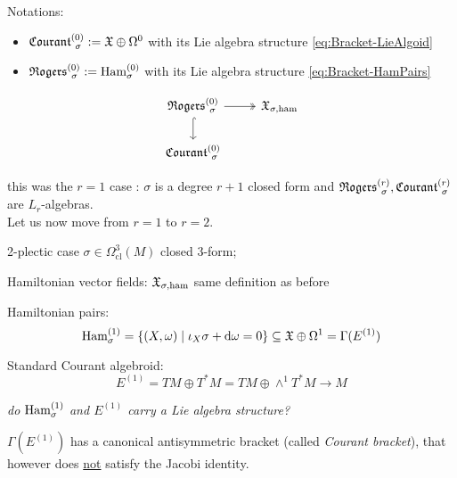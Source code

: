 \documentclass[beamer,10pt]{standalone}
\begin{document}
\begin{frame}
	\begin{block}{Notations:}
		\begin{itemize}
			\item $\Courant[\sigma]{0} := \X\oplus \Omega^{0}$ with its Lie algebra structure \eqref{eq:Bracket-LieAlgoid}
			\item $\Rogers[\sigma]{0} := \Ham^{(0)}_\sigma$ with its Lie algebra structure \eqref{eq:Bracket-HamPairs}
		\end{itemize}
	\end{block}
	\vfill

	\begin{displaymath}
		\begin{tikzcd}[ampersand replacement=\&]
			\Rogers[\sigma]{0}   \ar[r,two heads]\ar[d,hook]\& \X_{\sigma,\ham}
			\\ 
			\Courant[\sigma]{0}
		\end{tikzcd}
	\end{displaymath}
	\vfill

	\seprule
	this was the $r=1$ case : $\sigma$ is a degree $r+1$ closed form and $\Rogers[\sigma]{r},\Courant[\sigma]{r}$ are $L_r$-algebras.
	\\
	Let us now move from $r=1$ to $r=2$.

\end{frame}

\begin{frame}{2-plectic case}
	$\sigma \in \Omega^3_{\mathrm{cl}}(M)$ closed 3-form;
	\vfill

	Hamiltonian vector fields: $\X_{\sigma,\ham}$ same definition as before
	\vfill

	Hamiltonian pairs:
	$$
		\Ham^{(1)}_\sigma = \{ (X,\omega) \mid \iota_X \sigma + \d \omega  = 0 \}\subseteq \X\oplus \Omega^1 = \Gamma(E^{(1)})
	$$
	\vfill
	
	Standard Courant algebroid:
	$$ E^{(1)} = TM \oplus T^*M = TM \oplus \wedge^1 T^* M \to M$$
	\vfill

	\emph{do $\Ham^{(1)}_\sigma$ and $E^{(1)}$ carry a Lie algebra structure?}
	\vfill

	$\Gamma(E^{(1)})$ has a canonical antisymmetric bracket (called \emph{Courant bracket}), that however does \underline{not} satisfy the Jacobi identity.
\end{frame}
\end{document}

